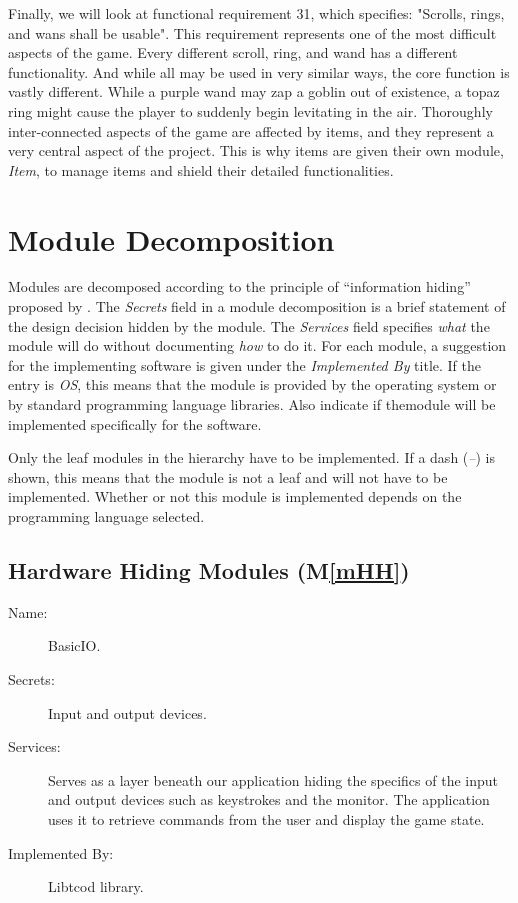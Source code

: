 \documentclass[12pt, titlepage]{article}
\newcommand{\newSection}[1]{
  \newpage
  \section{#1}
}
\newcommand{\mref}[1]{M\ref{#1}}
\begin{document}
	Finally, we will look at functional requirement 31, which specifies: "Scrolls, rings, and wans shall be usable". This requirement represents one of the most difficult aspects of the game. Every different scroll, ring, and wand has a different functionality. And while all may be used in very similar ways, the core function is vastly different. While a purple wand may zap a goblin out of existence, a topaz ring might cause the player to suddenly begin levitating in the air. Thoroughly inter-connected aspects of the game are affected by items, and they represent a very central aspect of the project. This is why items are given their own module, \textit{Item}, to manage items and shield their detailed functionalities.\\



\newSection{Module Decomposition} \label{SecMD}

	Modules are decomposed according to the principle of ``information hiding'' proposed by \citet{ParnasEtAl1984}. The \emph{Secrets} field in a module decomposition is a brief statement of the design decision hidden by the module. The \emph{Services} field specifies \emph{what} the module will do without documenting \emph{how} to do it. For each module, a suggestion for the implementing software is given under the \emph{Implemented By} title. If the entry is \emph{OS}, this means that the module is provided by the operating system or by standard programming language libraries.  Also indicate if themodule will be implemented specifically for the software.

	Only the leaf modules in the hierarchy have to be implemented. If a dash (\emph{--}) is shown, this means that the module is not a leaf and will not have to be implemented. Whether or not this module is implemented depends on the programming language selected.

	\subsection{Hardware Hiding Modules (\mref{mHH})}

		\bigskip\begin{description}
			\item[Name:]BasicIO.
			\item[Secrets:]Input and output devices.
			\item[Services:]Serves as a layer beneath our application hiding the specifics of the
			input and output devices such as keystrokes and the monitor. The application uses it
			to retrieve commands from the user and display the game state.
			\item[Implemented By:] Libtcod library.
		\end{description}
\end{document}

